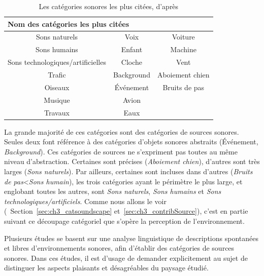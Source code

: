 {\begin{table}[t]
\centering
\begin{tabular}{ccc}    
\multicolumn{3}{l}{Nom des catégories les plus citées} \\             
\hline
Sons naturels                    & Voix       & Voiture\\
Sons humains                     & Enfant     & Machine\\
Sons technologiques/artificielles & Cloche     & Vent \\
Trafic                           & Background & Aboiement chien\\
Oiseaux                          & Événement  & Bruits de pas\\
Musique                          & Avion      & \\
Travaux                          & Eaux       & \\
\hline
\end{tabular}
\vspace{0.5mm}
\caption{Les catégories sonores les plus citées, d'après \citep{niessen2010categories}}
\label{tab:categoNiessen}
\end{table}

La grande majorité de ces catégories sont des catégories de sources sonores. Seules deux font référence à des catégories d'objets sonores abstraits (Événement, \emph{Background}). Ces catégories de sources ne s'expriment pas toutes au même niveau d'abstraction. Certaines sont précises (\emph{Aboiement chien}), d'autres sont très larges (\emph{Sons naturels}). Par ailleurs, certaines sont incluses dans d'autres (\emph{Bruits de pas}<\emph{Sons humain}), les trois catégories ayant le périmètre le plus large, et englobant toutes les autres, sont \emph{Sons naturels}, \emph{Sons humains} et \emph{Sons technologiques/artificiels}. Comme nous allons le voir (\cf~Section~\ref{sec:ch3_catsoundscape} et~\ref{sec:ch3_contribSource}), c'est en partie suivant ce découpage catégoriel que s'opère la perception de l'environnement.

Plusieurs études se basent sur une analyse linguistique de descriptions spontanées et libres d'environnements sonores, afin d'établir des catégories de sources sonores. Dans ces études, il est d'usage de demander explicitement au sujet de distinguer les aspects plaisants et désagréables du paysage étudié.

}

